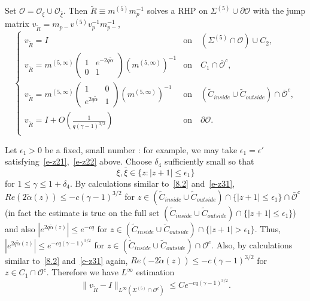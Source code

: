 \documentclass{amsart}
\theoremstyle{definition}
\theoremstyle{remark}
\numberwithin{equation}{section}
\newcommand{\wt}{\widetilde}
\begin{document}
Set $\mathcal{O}= {\mathcal{O}}_\xi\cup {\mathcal{O}}_{\bar{\xi}}$.
Then $\wt{R}\equiv m^{(5)}m_p^{-1}$ solves a RHP on 
$\Sigma^{(5)}\cup\partial\mathcal{O}$ with 
the jump matrix $v_{\wt{R}}=m_{p-}v^{(5)}v_p^{-1}m_{p-}^{-1}$, 
\begin{equation}
  \begin{cases}
    v_{\wt{R}}= I& \text{on} \quad (\Sigma^{(5)}\cap\mathcal{O})\cup C_2,\\
    v_{\wt{R}}= m^{(5,\infty)} \begin{pmatrix} 1&e^{-2q\wt{\alpha}}\\ 0&1 
\end{pmatrix} (m^{(5,\infty)})^{-1}& 
\text{on} \quad  C_1 \cap\bar{\mathcal{O}}^c, \\
    v_{\wt{R}}= m^{(5,\infty)} \begin{pmatrix} 1&0\\ 
e^{2q\wt{\alpha}}&1 \end{pmatrix}
(m^{(5,\infty)})^{-1}& \text{on} \quad 
(\wt{C}_{inside}\cup\wt{C}_{outside})\cap\bar{\mathcal{O}}^c ,\\
    v_{\wt{R}}=I+O(\frac1{q(\gamma-1)^{3/2}})& \text{on} 
\quad \partial\mathcal{O}.\\
  \end{cases}
\end{equation}

Let $\epsilon_1>0$ be a fixed, small number : for example, we may take 
$\epsilon_1=\epsilon'$ satisfying~\eqref{e-z21},~\eqref{e-z22} above.
Choose $\delta_4$ sufficiently small so that 
\begin{equation}\label{e-z30}
   \xi,\bar{\xi} \in \{z : |z+1|\le\epsilon_1\}
\end{equation}
for $1\le\gamma\le 1+\delta_4$.
By calculations similar to~\eqref{8.2} and~\eqref{e-z31}, 
$Re(2\tilde\alpha(z))\leq -c(\gamma-1)^{3/2}$ for
$z\in (\wt{C}_{inside}\cup\wt{C}_{outside})\cap \{|z+1|\le\epsilon_1\}
\cap \bar{\mathcal{O}}^c$ (in fact the estimate is true on the full set 
$(\wt{C}_{inside}\cup\wt{C}_{outside})\cap \{|z+1|\le\epsilon_1\}$) 
and also $|e^{2q\tilde\alpha(z)}|\leq e^{-cq}$ for 
$z\in (\wt{C}_{inside}\cup\wt{C}_{outside})\cap \{|z+1|>\epsilon_1\}$.
Thus, 
$|e^{2q\tilde\alpha(z)}|\leq e^{-cq(\gamma-1)^{3/2}}$ for 
$z\in (\wt{C}_{inside}\cup\wt{C}_{outside})\cap \mathcal{O}^c$. 
Also, by calculations similar to~\eqref{8.2} and~\eqref{e-z31} again,
$Re(-2\tilde\alpha(z))\leq -c(\gamma-1)^{3/2}$ for 
$z\in C_1\cap \mathcal{O}^c$. 
Therefore we have $L^{\infty}$ estimation 
\begin{equation}\label{e-z32}
   \|v_{\wt{R}} -I \|_{L^\infty(\Sigma^{(5)}\cap\mathcal{O}^c)}
\leq Ce^{-cq(\gamma-1)^{3/2}}.
\end{equation}
\end{document}

